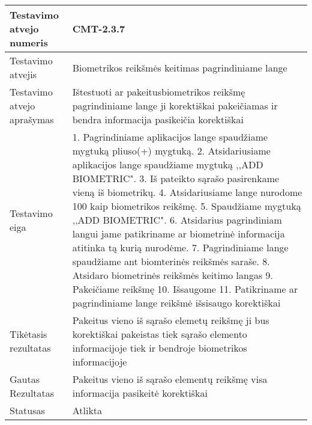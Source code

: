 \documentclass[oneside]{VUMIFPSkursinis}
\begin{document}
\begin{center}
    \begin{tabular}{ |p{5cm}|p{13cm}|}
    \hline
        Testavimo atvejo numeris & CMT-2.3.7  \\ \hline
        Testavimo atvejis & Biometrikos reikšmės keitimas pagrindiniame lange \\ \hline
        Testavimo atvejo aprašymas & Ištestuoti ar pakeitusbiometrikos reikšmę pagrindiniame lange ji korektiškai pakeičiamas ir bendra informacija pasikeičia korektiškai \\ \hline
        Testavimo eiga &  1. Pagrindiniame aplikacijos lange spaudžiame mygtuką pliuso(+) mygtuką. 
				2. Atsidariusiame aplikacijos lange spaudžiame mygtuką ,,ADD BIOMETRIC". 
				3. Iš pateikto sąrašo pasirenkame vieną iš biometrikų. 
				4. Atsidariusiame lange nurodome 100 kaip biometrikos reikšmę.
				5. Spaudžiame mygtuką ,,ADD BIOMETRIC".
				6. Atsidarius pagrindiniam langui jame patikriname ar biometrinė informacija atitinka tą kurią nurodėme.
				7. Pagrindiniame lange spaudžiame ant biomterinės reikšmės saraše.
				8. Atsidaro biometrinės reikšmės keitimo langas
				9. Pakeičiame reikšmę
				10. Išsaugome
				11. Patikriname ar pagrindiniame lange reikšmė išsisaugo korektiškai \\ \hline
        Tikėtasis rezultatas &  Pakeitus vieno iš sąrašo elemetų reikšmę ji bus korektiškai pakeistas tiek sąrašo elemento informacijoje tiek ir bendroje biometrikos informacijoje \\ \hline
        Gautas Rezultatas & Pakeitus vieno iš sąrašo elementų reikšmę visa informacija pasikeitė korektiškai \\ \hline
        Statusas &  Atlikta\\ \hline
    \hline
    \end{tabular}
\end{center}
\end{document}
